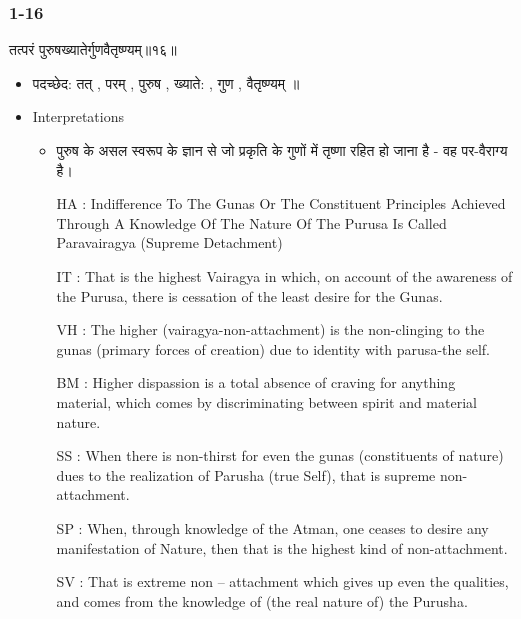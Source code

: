 \begin{frame}[fragile]\frametitle{1-16}
\begin{sanskrit}
तत्परं पुरुषख्यातेर्गुणवैतृष्ण्यम्॥१६॥
\end{sanskrit}

	\begin{itemize}
	\item पदच्छेद: तत् , परम् , पुरुष , ख्याते: , गुण , वैतृष्ण्यम् ॥
	\item Interpretations
		\begin{itemize}		
		\item पुरुष के असल स्वरूप के ज्ञान से जो प्रकृति के गुणों में तृष्णा रहित हो जाना है - वह पर-वैराग्य है।
		\item [HA]: Indifference To The Gunas Or The Constituent Principles Achieved Through A Knowledge Of The Nature Of The Purusa Is Called Paravairagya (Supreme Detachment)
		\item [IT]: That is the highest Vairagya in which, on account of the awareness of the Purusa, there is cessation of the least desire for the Gunas.
		\item [VH]: The higher (vairagya-non-attachment) is the non-clinging to the gunas (primary forces of creation) due to identity with parusa-the self.
		\item [BM]: Higher dispassion is a total absence of craving for anything material, which comes by discriminating between spirit and material nature.
		\item [SS]: When there is non-thirst for even the gunas (constituents of nature) dues to the realization of Parusha (true Self), that is supreme non-attachment.
		\item [SP]: When, through knowledge of the Atman, one ceases to desire any manifestation of Nature, then that is the highest kind of non-attachment.
		\item [SV]: That is extreme non – attachment which gives up even the qualities, and comes from the knowledge of (the real nature of) the Purusha. 
		\end{itemize}
	\end{itemize}
	
\end{frame}




